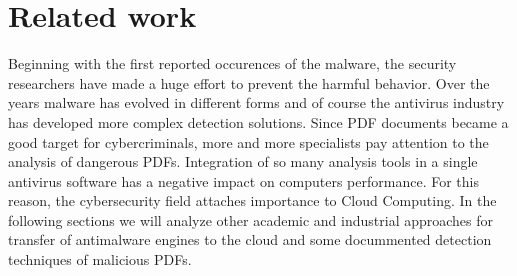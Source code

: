 \chapter{Related work}
\label{chapter:relatedWork}
Beginning with the first reported occurences of the malware, the security researchers have made a huge effort to prevent the harmful behavior. Over the years malware has evolved in different forms and of course the antivirus industry has developed more complex detection solutions. Since PDF documents became a good target for cybercriminals, more and more specialists pay attention to the analysis of dangerous PDFs. Integration of so many analysis tools in a single antivirus software has a negative impact on computers performance. For this reason, the cybersecurity field attaches importance to Cloud Computing. In the following sections we will analyze other academic and industrial approaches for transfer of antimalware engines to the cloud and some docummented detection techniques of malicious PDFs.


